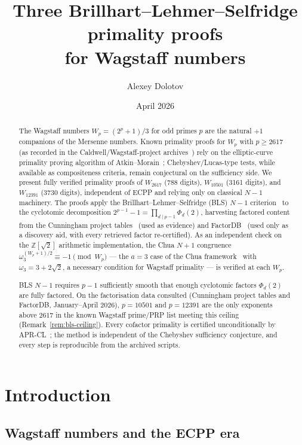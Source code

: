 \documentclass[11pt,a4paper]{amsart}
\title[Three BLS primality proofs for Wagstaff numbers]
      {Three Brillhart--Lehmer--Selfridge primality proofs \\ for Wagstaff numbers}
\author{Alexey Dolotov}
\date{April 2026}
\theoremstyle{plain}
\theoremstyle{definition}
\newcommand{\Z}{\mathbb{Z}}
\begin{document}
\begin{abstract}
The Wagstaff numbers $W_p = (2^p + 1)/3$ for odd primes $p$ are the
natural $+1$ companions of the Mersenne numbers. Known primality proofs
for $W_p$ with $p \geq 2617$ (as recorded in the
Caldwell/Wagstaff-project archives~\cite{Cunningham,Caldwell}) rely on
the elliptic-curve primality proving algorithm of
Atkin--Morain~\cite{AtkinMorain}; Chebyshev/Lucas-type tests, while
available as compositeness criteria, remain conjectural on the
sufficiency side. We present fully verified primality proofs of
$W_{2617}$ (788 digits), $W_{10501}$ (3161 digits), and $W_{12391}$
(3730 digits), independent of ECPP and relying only on classical
$N-1$ machinery. The proofs apply the Brillhart--Lehmer--Selfridge (BLS)
$N - 1$ criterion~\cite{BLS75} to the cyclotomic decomposition
$2^{p-1} - 1 = \prod_{d \mid p-1} \Phi_d(2)$, harvesting factored
content from the Cunningham project tables~\cite{Cunningham} (used as
evidence) and FactorDB~\cite{FactorDB} (used only as a discovery aid,
with every retrieved factor re-certified). As an independent check on
the $\Z[\sqrt{2}]$ arithmetic implementation, the Chua $N + 1$
congruence $\omega_3^{(W_p + 1)/2} \equiv -1 \pmod{W_p}$ --- the
$a=3$ case of the Chua framework~\cite{Chua} with
$\omega_3 = 3 + 2\sqrt{2}$, a necessary condition for Wagstaff
primality --- is verified at each $W_p$.

BLS $N - 1$ requires $p - 1$ sufficiently smooth that enough
cyclotomic factors $\Phi_d(2)$ are fully factored. On the
factorisation data consulted (Cunningham project tables and FactorDB,
January--April 2026), $p = 10501$ and $p = 12391$ are the only
exponents above $2617$ in the known Wagstaff prime/PRP list meeting
this ceiling (Remark~\ref{rem:bls-ceiling}). Every cofactor primality
is certified unconditionally by APR-CL~\cite{APR,CohenLenstraAlgo};
the method is independent of the Chebyshev sufficiency conjecture,
and every step is reproducible from the archived scripts.
\end{abstract}

\maketitle

\section{Introduction}

\subsection{Wagstaff numbers and the ECPP era}
\end{document}
